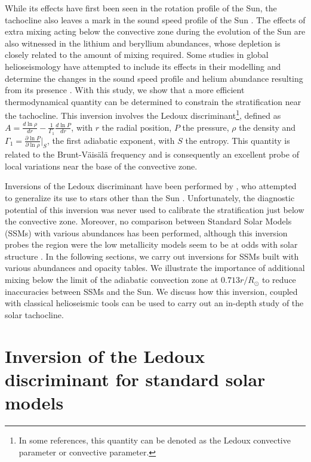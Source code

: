 \documentclass[a4paper,fleqn,usenatbib]{mnras}
\begin{document}
	While its effects have first been seen in the rotation profile of the Sun, the tachocline also leaves a mark in the sound speed profile of the Sun \citep{MonteiroOne,AntiaChitre98}. The effects of extra mixing acting below the convective zone during the evolution of the Sun are also witnessed in the lithium and beryllium abundances, whose depletion is closely related to the amount of mixing required. Some studies in global helioseismology have attempted to include its effects in their modelling and determine the changes in the sound speed profile and helium abundance resulting from its presence \citep{Richard96Sun,Richard97Sun,Brun02TachoMix,Richard2004DiffCirc}. With this study, we show that a more efficient thermodynamical quantity can be determined to constrain the stratification near the tachocline. This inversion involves the Ledoux discriminant\footnote{In some references, this quantity can be denoted as the Ledoux convective parameter or convective parameter.}, defined as $A=\frac{d \ln \rho}{dr}-\frac{1}{\Gamma_{1}}\frac{d \ln P}{dr}$, with $r$ the radial position, $P$ the pressure, $\rho$ the density and $\Gamma_{1}= \frac{\partial \ln P}{\partial \ln \rho} \vert_{S}$, the first adiabatic exponent, with $S$ the entropy. This quantity is related to the Brunt-V\"ais\"al\"a frequency and is consequently an excellent probe of local variations near the base of the convective zone.
	
	Inversions of the Ledoux discriminant have been performed by \cite{GoughPmod}, who attempted to generalize its use to stars other than the Sun \citep{GoughAster, TakataWhite}. Unfortunately, the diagnostic potential of this inversion was never used to calibrate the stratification just below the convective zone. Moreover, no comparison between Standard Solar Models (SSMs) with various abundances has been performed, although this inversion probes the region were the low metallicity models seem to be at odds with solar structure \citep{SerenelliComp}. In the following sections, we carry out inversions for SSMs built with various abundances and opacity tables. We illustrate the importance of additional mixing below the limit of the adiabatic convection zone at $0.713r/R_{\odot}$ \citep{KosConv} to reduce inaccuracies between SSMs and the Sun. We discuss how this inversion, coupled with classical helioseismic tools can be used to carry out an in-depth study of the solar tachocline.

\section{Inversion of the Ledoux discriminant for standard solar models}\label{secASSM}
\end{document}
